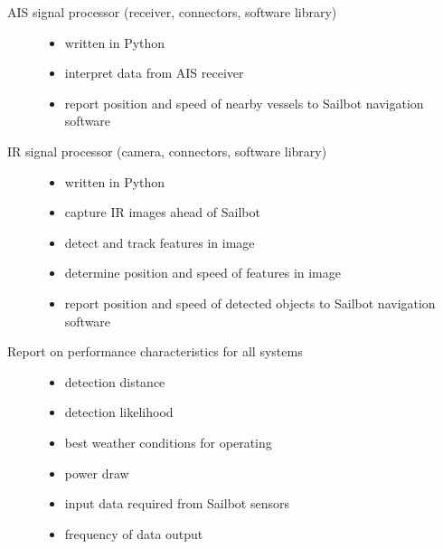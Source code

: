 
\iffalse
This is a direct follow-up from the details contained in the Project Proposal section. The list can describe the final state of each item in the list, any differences between the original deliverables and the actual deliverables, and in what form the Project Sponsor can expect to receive the Deliverable from the Team Members.
\fi


\begin{description}
\item[AIS signal processor (receiver, connectors, software library)] \hfill
\begin{itemize}
\item written in Python
\item interpret data from AIS receiver
\item report position and speed of nearby vessels to Sailbot navigation software
\end{itemize}

\item[IR signal processor (camera, connectors, software library)] \hfill
\begin{itemize}
\item written in Python
\item capture IR images ahead of Sailbot
\item detect and track features in image
\item determine position and speed of features in image
\item report position and speed of detected objects to Sailbot navigation software
\end{itemize}

\item[Report on performance characteristics for all systems] \hfill
\begin{itemize}
\item detection distance
\item detection likelihood
\item best weather conditions for operating
\item power draw
\item input data required from Sailbot sensors
\item frequency of data output
\end{itemize}
\end{description}

